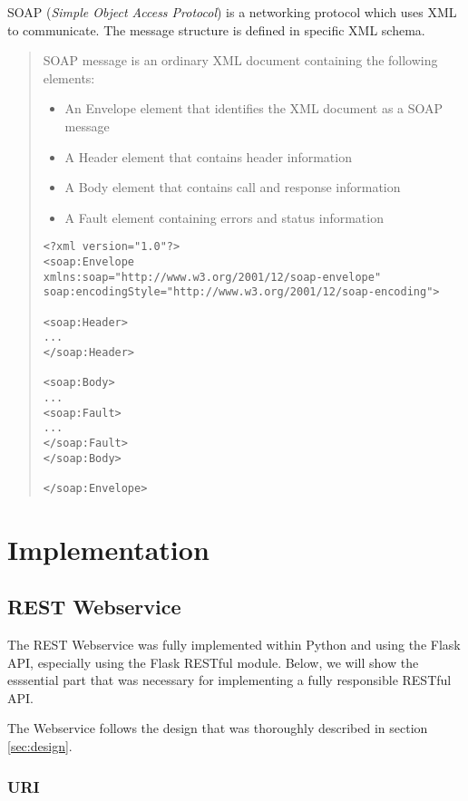 \documentclass[11pt, a4paper]{article}
\begin{document}
SOAP (\textit{Simple Object Access Protocol}) is a networking protocol which uses XML to communicate. The message structure is defined in specific XML schema.

\begin{quote}
SOAP message is an ordinary XML document containing the following elements:

\begin{itemize}
	\item An Envelope element that identifies the XML document as a SOAP message
	\item A Header element that contains header information
	\item A Body element that contains call and response information
	\item A Fault element containing errors and status information
\end{itemize}
	
\begin{lstlisting}
<?xml version="1.0"?>
<soap:Envelope
xmlns:soap="http://www.w3.org/2001/12/soap-envelope"
soap:encodingStyle="http://www.w3.org/2001/12/soap-encoding">
	
<soap:Header>
...
</soap:Header>
	
<soap:Body>
...
<soap:Fault>
...
</soap:Fault>
</soap:Body>
	
</soap:Envelope>
\end{lstlisting}
\vspace{10pt}
\cite{soap}

\end{quote}

\section{Implementation}

\subsection{REST Webservice}

The REST Webservice was fully implemented within Python and using the Flask API,
especially using the Flask RESTful module. Below, we will show the esssential
part that was necessary for implementing a fully responsible RESTful API.  

The Webservice follows the design that was thoroughly described in section
\ref{sec:design}.

\subsubsection{URI}
\end{document}
